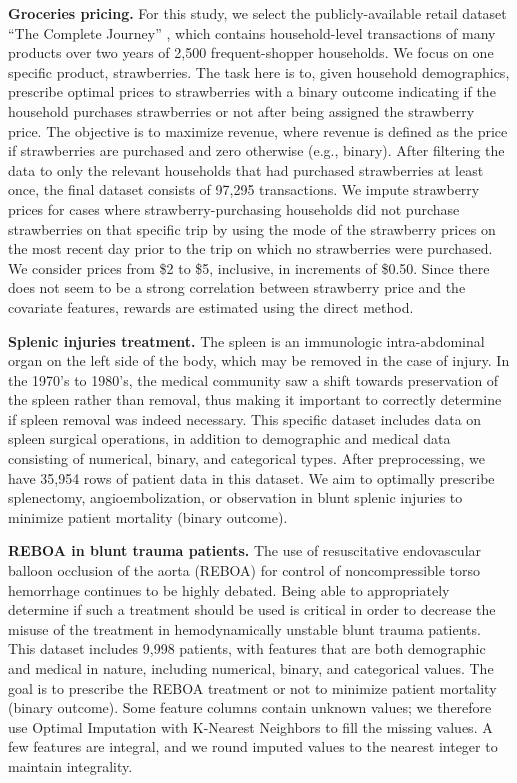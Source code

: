 \documentclass[10pt]{article} %
\begin{document}
\textbf{Groceries pricing.} For this study, we select the
publicly-available retail dataset ``The Complete Journey'' \citep{groceries-dataset, groceries-article}, which contains household-level transactions of many products over two years of 2,500 frequent-shopper households. We focus on one specific product, strawberries. The task here is to, given household demographics, prescribe optimal prices to strawberries with a binary outcome indicating if the household purchases strawberries or not after being assigned the strawberry price. The objective is to maximize revenue, where revenue is defined as the price if strawberries are purchased and zero otherwise (e.g., binary). After filtering the data to only the relevant households that had purchased strawberries at least once, the final dataset consists of 97,295 transactions. We impute strawberry prices for cases where strawberry-purchasing households did not purchase strawberries on that specific trip by using the mode of the strawberry prices on the most recent day prior to the trip on which no strawberries were purchased. We consider prices from \$2 to \$5, inclusive, in increments of \$0.50. Since there does not seem to be a strong correlation between strawberry price and the covariate features, rewards are estimated using the direct method. 

\textbf{Splenic injuries treatment.} The spleen is an immunologic intra-abdominal organ on the left side of the body, which may be removed in the case of injury. In the 1970's to 1980's, the medical community saw a shift towards preservation of the spleen rather than removal, thus making it important to correctly determine if spleen removal was indeed necessary. This specific dataset includes data on spleen surgical operations, in addition to demographic and medical data consisting of numerical, binary, and categorical types. After preprocessing, we have 35,954 rows of patient data in this dataset. We aim to optimally prescribe splenectomy, angioembolization, or observation in blunt splenic injuries to minimize patient mortality (binary outcome).

\textbf{REBOA in blunt trauma patients.} The use of resuscitative endovascular balloon occlusion of the aorta (REBOA) for control of noncompressible torso hemorrhage continues to be highly debated. Being able to appropriately determine if such a treatment should be used is critical in order to decrease the misuse of the treatment in hemodynamically unstable blunt trauma patients. This dataset includes 9,998 patients, with features that are both demographic and medical in nature, including numerical, binary, and categorical values. The goal is to prescribe the REBOA treatment or not to minimize patient mortality (binary outcome). Some feature columns contain unknown values; we therefore use Optimal Imputation \citep{Bertsimas2017FromPM} with K-Nearest Neighbors to fill the missing values. A few features are integral, and we round imputed values to the nearest integer to maintain integrality.
\end{document}
